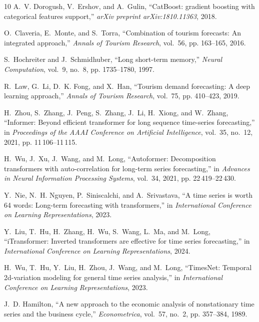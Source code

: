 \documentclass[10pt,journal,compsoc]{IEEEtran}
\begin{document}
\begin{thebibliography}{10}
A.~V. Dorogush, V.~Ershov, and A.~Gulin, ``{CatBoost}: gradient boosting with
  categorical features support,'' \emph{arXiv preprint arXiv:1810.11363}, 2018.

O.~Claveria, E.~Monte, and S.~Torra, ``Combination of tourism forecasts: An
  integrated approach,'' \emph{Annals of Tourism Research}, vol.~56, pp.
  163--165, 2016.

S.~Hochreiter and J.~Schmidhuber, ``Long short-term memory,'' \emph{Neural
  Computation}, vol.~9, no.~8, pp. 1735--1780, 1997.

R.~Law, G.~Li, D.~K. Fong, and X.~Han, ``Tourism demand forecasting: A deep
  learning approach,'' \emph{Annals of Tourism Research}, vol.~75, pp. 410--423,
  2019.

H.~Zhou, S.~Zhang, J.~Peng, S.~Zhang, J.~Li, H.~Xiong, and W.~Zhang,
  ``Informer: Beyond efficient transformer for long sequence time-series
  forecasting,'' in \emph{Proceedings of the AAAI Conference on Artificial
  Intelligence}, vol.~35, no.~12, 2021, pp. 11\,106--11\,115.

H.~Wu, J.~Xu, J.~Wang, and M.~Long, ``Autoformer: Decomposition transformers
  with auto-correlation for long-term series forecasting,'' in \emph{Advances
  in Neural Information Processing Systems}, vol.~34, 2021, pp.
  22\,419--22\,430.

Y.~Nie, N.~H. Nguyen, P.~Siniscalchi, and A.~Srivastava, ``A time series is
  worth 64 words: Long-term forecasting with transformers,'' in
  \emph{International Conference on Learning Representations}, 2023.

Y.~Liu, T.~Hu, H.~Zhang, H.~Wu, S.~Wang, L.~Ma, and M.~Long, ``{iTransformer}:
  Inverted transformers are effective for time series forecasting,'' in
  \emph{International Conference on Learning Representations}, 2024.

H.~Wu, T.~Hu, Y.~Liu, H.~Zhou, J.~Wang, and M.~Long, ``{TimesNet}: Temporal
  2d-variation modeling for general time series analysis,'' in
  \emph{International Conference on Learning Representations}, 2023.

J.~D. Hamilton, ``A new approach to the economic analysis of nonstationary time
  series and the business cycle,'' \emph{Econometrica}, vol.~57, no.~2, pp.
  357--384, 1989.


\end{thebibliography}
\end{document}
